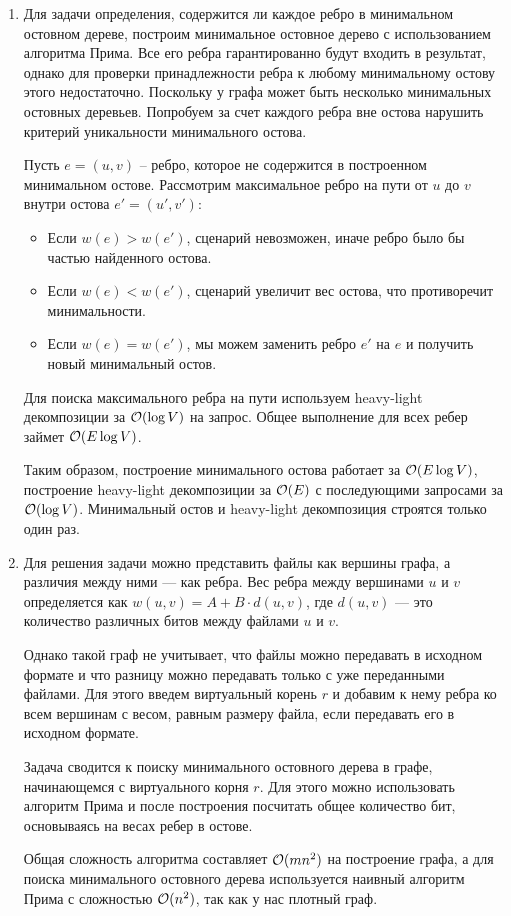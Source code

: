 \begin{enumerate}
    

\item

    Для задачи определения, содержится ли каждое ребро в минимальном остовном дереве, построим минимальное остовное дерево с использованием алгоритма Прима.
    Все его ребра гарантированно будут входить в результат, однако для проверки принадлежности ребра к любому минимальному остову этого недостаточно.
    Поскольку у графа может быть несколько минимальных остовных деревьев. Попробуем за счет каждого ребра вне остова нарушить критерий уникальности
    минимального остова.

    Пусть $e = (u, v)$ -- ребро, которое не содержится в построенном минимальном остове.
    Рассмотрим максимальное ребро на пути от $u$ до $v$ внутри остова $e' = (u', v')$:

    \begin{itemize}
        \item Если $w(e) > w(e')$, сценарий невозможен, иначе ребро было бы частью найденного остова.
        \item Если $w(e) < w(e')$, сценарий увеличит вес остова, что противоречит минимальности.
        \item Если $w(e) = w(e')$, мы можем заменить ребро $e'$ на $e$ и получить новый минимальный остов.
    \end{itemize}

    Для поиска максимального ребра на пути используем heavy-light декомпозиции за $\mathcal{O}(\log V)$ на запрос.
    Общее выполнение для всех ребер займет $\mathcal{O}(E \log V)$.

    Таким образом, построение минимального остова работает за $\mathcal{O}(E \log V)$, построение heavy-light декомпозиции
    за $\mathcal{O}(E)$ с последующими запросами за $\mathcal{O}(\log V)$. Минимальный остов и heavy-light декомпозиция строятся только один раз.

\item

    Для решения задачи можно представить файлы как вершины графа, а различия между ними — как ребра.
    Вес ребра между вершинами \(u\) и \(v\) определяется как \(w(u, v) = A + B \cdot d(u, v)\),
    где \(d(u, v)\) — это количество различных битов между файлами \(u\) и \(v\).

    Однако такой граф не учитывает, что файлы можно передавать в исходном формате и что разницу можно передавать только с уже переданными файлами.
    Для этого введем виртуальный корень \(r\) и добавим к нему ребра ко всем вершинам с весом, равным размеру файла, если передавать его в исходном формате.

    Задача сводится к поиску минимального остовного дерева в графе, начинающемся с виртуального корня \(r\).
    Для этого можно использовать алгоритм Прима и после построения посчитать общее количество бит, основываясь на весах ребер в остове.

    Общая сложность алгоритма составляет \(\mathcal{O}(mn^2)\) на построение графа, а для поиска минимального остовного
    дерева используется наивный алгоритм Прима с сложностью \(\mathcal{O}(n^2)\), так как у нас плотный граф.

\end{enumerate}
